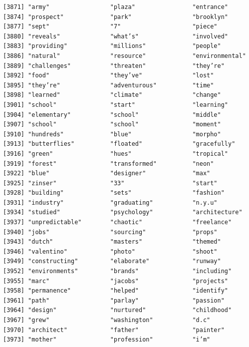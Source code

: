 \documentclass[
  letterpaper,
  DIV=11,
  numbers=noendperiod]{scrartcl}
\begin{document}
\begin{verbatim}
[3871] "army"                 "plaza"                "entrance"            
[3874] "prospect"             "park"                 "brooklyn"            
[3877] "sept"                 "7"                    "piece"               
[3880] "reveals"              "what’s"               "involved"            
[3883] "providing"            "millions"             "people"              
[3886] "natural"              "resource"             "environmental"       
[3889] "challenges"           "threaten"             "they’re"             
[3892] "food"                 "they’ve"              "lost"                
[3895] "they’re"              "adventurous"          "time"                
[3898] "learned"              "climate"              "change"              
[3901] "school"               "start"                "learning"            
[3904] "elementary"           "school"               "middle"              
[3907] "school"               "school"               "moment"              
[3910] "hundreds"             "blue"                 "morpho"              
[3913] "butterflies"          "floated"              "gracefully"          
[3916] "green"                "hues"                 "tropical"            
[3919] "forest"               "transformed"          "neon"                
[3922] "blue"                 "designer"             "max"                 
[3925] "zinser"               "33"                   "start"               
[3928] "building"             "sets"                 "fashion"             
[3931] "industry"             "graduating"           "n.y.u"               
[3934] "studied"              "psychology"           "architecture"        
[3937] "unpredictable"        "chaotic"              "freelance"           
[3940] "jobs"                 "sourcing"             "props"               
[3943] "dutch"                "masters"              "themed"              
[3946] "valentino"            "photo"                "shoot"               
[3949] "constructing"         "elaborate"            "runway"              
[3952] "environments"         "brands"               "including"           
[3955] "marc"                 "jacobs"               "projects"            
[3958] "permanence"           "helped"               "identify"            
[3961] "path"                 "parlay"               "passion"             
[3964] "design"               "nurtured"             "childhood"           
[3967] "grew"                 "washington"           "d.c"                 
[3970] "architect"            "father"               "painter"             
[3973] "mother"               "profession"           "i’m"                 

\end{verbatim}
\end{document}
